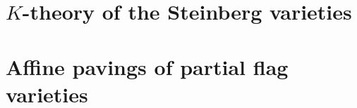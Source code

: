 \documentclass[reqno,11pt]{book}
\numberwithin{equation}{section}
\theoremstyle{plain}
\theoremstyle{plain}
\numberwithin{equation}{section}
\theoremstyle{remark}
\theoremstyle{theoremletter}
\begin{document}
\setcounter{tocdepth}{1}


\makeatletter
\def\@chapter[#1]#2{\ifnum \c@secnumdepth >\m@ne
                       \if@mainmatter
                         \refstepcounter{chapter}%
                         \typeout{\@chapapp\space\thechapter.}%
                       \else
                         \addcontentsline{lot}{chapter}{#1}%
                       \fi
                    \else
                      \addcontentsline{lot}{chapter}{#1}%
                    \fi
                    \chaptermark{#1}%
                    \if@twocolumn
                      \@topnewpage[\@makechapterhead{#2}]%
                    \else
                      \@makechapterhead{#2}%
                      \@afterheading
                    \fi}
\makeatother




\part{{$K$-theory of the Steinberg varieties}}\label{part:Steinberg_varieties}







\part{Affine pavings of partial flag varieties}\label{part:partial_flag_varieties}







\begingroup
\let\cleardoublepage\relax
{}
\listoftables
{}
\listoffigures
\endgroup





\end{document}
